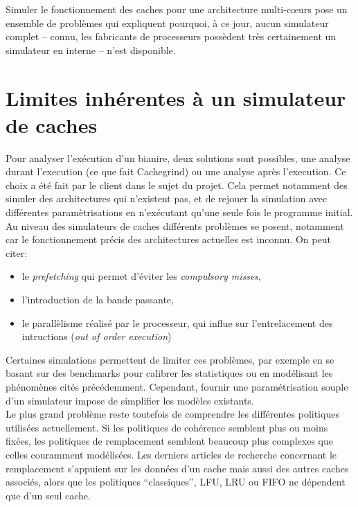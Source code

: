 Simuler le fonctionnement des caches pour une architecture multi-c{\oe}urs pose un ensemble de problèmes qui expliquent pourquoi, à ce jour, aucun simulateur complet -- connu, les fabricants de processeurs possèdent très certainement un simulateur en interne -- n'est disponible. 

\section{Limites inhérentes à un simulateur de caches}
Pour analyser l'exécution d'un bianire, deux solutions sont possibles, une analyse durant l'execution (ce que fait \textsf{Cachegrind}) ou une analyse après l'execution. Ce choix a été fait par le client dans le sujet du projet. Cela permet notamment des simuler des architectures qui n'existent pas, et de rejouer la simulation avec différentes paramètrisations en n'exécutant qu'une seule fois le programme initial. \\

Au niveau des simulateurs de caches différents problèmes se posent, notamment car le fonctionnement précis des architectures actuelles est inconnu. On peut citer:
\begin{itemize}
\item le \emph{prefetching} qui permet d'éviter les \emph{compulsory misses}, 
\item l'introduction de la bande passante, 
\item le parallèlisme réalisé par le processeur, qui influe sur l'entrelacement des intructions (\emph{out of order execution}) \\
\end{itemize}

Certaines simulations permettent de limiter ces problèmes, par exemple en se basant sur des benchmarks pour calibrer les statistiques ou en modélisant les phénomènes cités précédemment. Cependant, fournir une paramétrisation souple d'un simulateur impose de simplifier les modèles existants. \\

Le plus grand problème reste toutefois de comprendre les différentes politiques utilisées actuellement. Si les politiques de cohérence semblent plus ou moins fixées, les politiques de remplacement semblent beaucoup plus complexes que celles couramment modélisées. Les derniers articles de recherche concernant le remplacement s'appuient sur les données d'un cache mais aussi des autres caches associés, alors que les politiques ``classiques'', LFU, LRU ou FIFO ne dépendent que d'un seul cache.


